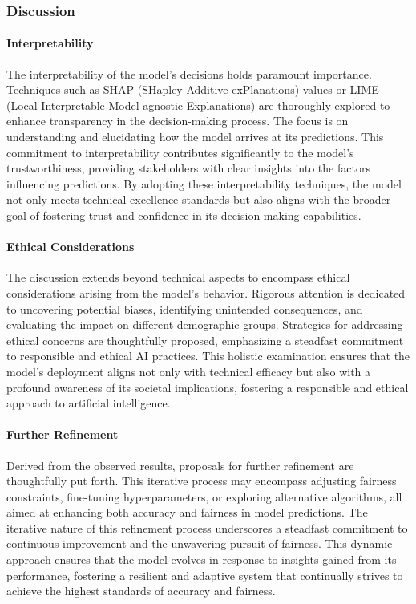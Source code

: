 \subsubsection{Discussion}

\paragraph{Interpretability}

The interpretability of the model's decisions holds paramount importance. Techniques such as SHAP (SHapley Additive exPlanations) values or LIME (Local Interpretable Model-agnostic Explanations) are thoroughly explored to enhance transparency in the decision-making process. The focus is on understanding and elucidating how the model arrives at its predictions. This commitment to interpretability contributes significantly to the model's trustworthiness, providing stakeholders with clear insights into the factors influencing predictions. By adopting these interpretability techniques, the model not only meets technical excellence standards but also aligns with the broader goal of fostering trust and confidence in its decision-making capabilities.

\paragraph{Ethical Considerations}

The discussion extends beyond technical aspects to encompass ethical considerations arising from the model's behavior. Rigorous attention is dedicated to uncovering potential biases, identifying unintended consequences, and evaluating the impact on different demographic groups. Strategies for addressing ethical concerns are thoughtfully proposed, emphasizing a steadfast commitment to responsible and ethical AI practices. This holistic examination ensures that the model's deployment aligns not only with technical efficacy but also with a profound awareness of its societal implications, fostering a responsible and ethical approach to artificial intelligence.

\paragraph{Further Refinement}

Derived from the observed results, proposals for further refinement are thoughtfully put forth. This iterative process may encompass adjusting fairness constraints, fine-tuning hyperparameters, or exploring alternative algorithms, all aimed at enhancing both accuracy and fairness in model predictions. The iterative nature of this refinement process underscores a steadfast commitment to continuous improvement and the unwavering pursuit of fairness. This dynamic approach ensures that the model evolves in response to insights gained from its performance, fostering a resilient and adaptive system that continually strives to achieve the highest standards of accuracy and fairness.

